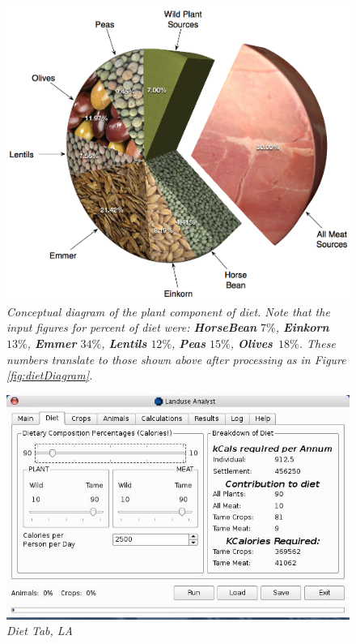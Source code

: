 \begin{figure}[htbp] %
  \includegraphics[scale=.2]{./images/dietFancyCrops.jpg}
  \caption[Plant Portion of Diet]{\label{fig:dietCropDiagram}\textit{Conceptual
    diagram of the plant component of diet.  Note that the input figures for
    percent of diet were: \textbf{HorseBean} $7\%$, \textbf{Einkorn} $13\%$,
    \textbf{Emmer} $34\%$, \textbf{Lentils} $12\%$, \textbf{Peas} $15\%$,
    \textbf{Olives}\ $18\%$.  These numbers translate to those shown above after
    processing as in Figure \ref{fig:dietDiagram}.}}
\end{figure}
\begin{figure}[htbp] %
  \includegraphics[scale=.355]{./images/LanduseAnalystDiet545.jpg}
  \caption{\label{fig:LADiet}\textit{Diet Tab, LA}}
\end{figure}
